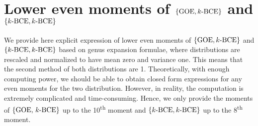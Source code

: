 \documentclass[11pt,reqno]{amsart}
\numberwithin{equation}{section}
\theoremstyle{plain}
\newtheorem{rem}[thm]{Remark}
\begin{document}


\section{Lower even moments of $\{\textup{GOE}, k\textup{-BCE}\}$ and $\{k\textup{-BCE}, k\textup{-BCE}\}$}

We provide here explicit expression of lower even moments of $\{\textup{GOE}, k\textup{-BCE}\}$ and $\{k\textup{-BCE}, k\textup{-BCE}\}$ based on genus expansion formulae, where distributions are rescaled and normalized to have mean zero and variance one. This means that the second method of both distributions are 1. Theoretically, with enough computing power, we should be able to obtain closed form expressions for any even moments for the two distribution. However, in reality, the computation is extremely complicated and time-consuming. Hence, we only provide the moments of $\{\textup{GOE, }k\textup{-BCE}\}$ up to the 10\textsuperscript{th} moment and $\{k\textup{-BCE}, k\textup{-BCE}\}$ up to the 8\textsuperscript{th} moment.

\end{document}
